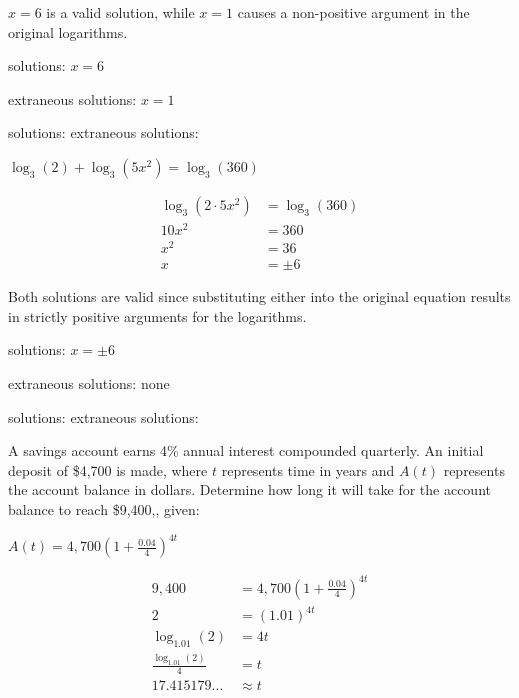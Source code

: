 \documentclass[addpoints]{exam}
\begin{document}
\begin{questions}
\begin{solution}
 \(x = 6\) is a valid solution, while \(x = 1\) causes a non-positive argument in the original logarithms. 

solutions: \(\boxed{ x = 6 }\)

extraneous solutions: \(\boxed{ x = 1 }\)
\end{solution}
\par solutions: \fillin\fillin {} extraneous solutions: \fillin\fillin\newpage

\question[6] \label{exact-end}
\(\displaystyle{ \log_{3}(2) + \log_{3}(5x^2) = \log_{3}(360) }\)
\begin{solution}
\[\begin{aligned} \log_{3}(2 \cdot 5x^2) &= \log_{3}(360) \\ 10x^2 &= 360 \\ x^2 &= 36 \\ x &= \pm 6 \end{aligned}\]

 Both solutions are valid since substituting either into the original equation results in strictly positive arguments for the logarithms. 

solutions: \(\boxed{ x = \pm 6 }\)

extraneous solutions: \(\boxed{ \text{none} }\)
\end{solution}
\par solutions: \fillin\fillin {} extraneous solutions: \fillin\fillin

\question[6] A savings account earns 4\% annual interest compounded quarterly. An initial deposit of \$4,700 is made, where $t$ represents time in years and $A(t)$ represents the account balance in dollars. Determine how long it will take for the account balance to reach \$9,400,, given:

\(\displaystyle{ \displaystyle{A(t) = 4,700 \left( 1 + \frac{0.04}{4} \right)^{4t}} }\)
\begin{solution}
\[\begin{aligned} 9,400 &= 4,700 \left( 1 + \frac{0.04}{4} \right)^{4t} \\ 2 &= (1.01)^{4t} \\ \log_{1.01}(2) &= 4t \\ \frac{\log_{1.01}(2)}{4} &= t \\ 17.415179... &\approx t \end{aligned}\]


\end{solution}
\end{questions}
\end{document}
